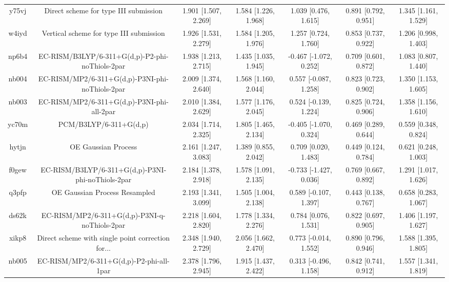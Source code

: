 \documentclass{article}
\begin{document}
\begin{center}
\begin{longtable}{|ccccccc|}
 y75vj &              Direct scheme for type III submission &  1.901 [1.507, 2.269] &  1.584 [1.226, 1.968] &     1.039 [0.476, 1.615] &  0.891 [0.792, 0.951] &   1.345 [1.161, 1.529] \\
 w4iyd &            Vertical scheme for type III submission &  1.926 [1.531, 2.279] &  1.584 [1.205, 1.976] &     1.257 [0.724, 1.760] &  0.853 [0.737, 0.922] &   1.206 [0.998, 1.403] \\
 np6b4 &    EC-RISM/B3LYP/6-311+G(d,p)-P2-phi-noThiols-2par &  1.938 [1.213, 2.715] &  1.435 [1.035, 1.945] &   -0.467 [-1.072, 0.252] &  0.709 [0.601, 0.872] &   1.083 [0.807, 1.440] \\
 nb004 &    EC-RISM/MP2/6-311+G(d,p)-P3NI-phi-noThiols-2par &  2.009 [1.374, 2.640] &  1.568 [1.160, 2.044] &    0.557 [-0.087, 1.258] &  0.823 [0.723, 0.902] &   1.350 [1.153, 1.605] \\
 nb003 &         EC-RISM/MP2/6-311+G(d,p)-P3NI-phi-all-2par &  2.010 [1.384, 2.629] &  1.577 [1.176, 2.045] &    0.524 [-0.139, 1.224] &  0.825 [0.724, 0.906] &   1.358 [1.156, 1.610] \\
 yc70m &                             PCM/B3LYP/6-311+G(d,p) &  2.034 [1.714, 2.325] &  1.805 [1.465, 2.134] &   -0.405 [-1.070, 0.324] &  0.469 [0.289, 0.644] &   0.559 [0.348, 0.824] \\
 hytjn &                                OE Gaussian Process &  2.161 [1.247, 3.083] &  1.389 [0.855, 2.042] &     0.709 [0.020, 1.483] &  0.449 [0.124, 0.784] &   0.621 [0.248, 1.003] \\
 f0gew &  EC-RISM/B3LYP/6-311+G(d,p)-P3NI-phi-noThiols-2par &  2.184 [1.378, 2.918] &  1.578 [1.091, 2.135] &   -0.733 [-1.427, 0.036] &  0.769 [0.667, 0.892] &   1.291 [1.017, 1.626] \\
 q3pfp &                      OE Gaussian Process Resampled &  2.193 [1.341, 3.099] &  1.505 [1.004, 2.138] &    0.589 [-0.107, 1.397] &  0.443 [0.138, 0.767] &   0.658 [0.283, 1.067] \\
 ds62k &      EC-RISM/MP2/6-311+G(d,p)-P3NI-q-noThiols-2par &  2.218 [1.604, 2.820] &  1.778 [1.334, 2.276] &     0.784 [0.076, 1.531] &  0.822 [0.697, 0.905] &   1.406 [1.197, 1.627] \\
 xikp8 &  Direct scheme with single point correction for... &  2.348 [1.940, 2.729] &  2.056 [1.662, 2.470] &    0.773 [-0.014, 1.552] &  0.890 [0.796, 0.946] &   1.588 [1.395, 1.805] \\
 nb005 &           EC-RISM/MP2/6-311+G(d,p)-P2-phi-all-1par &  2.378 [1.796, 2.945] &  1.915 [1.437, 2.422] &    0.313 [-0.496, 1.158] &  0.842 [0.741, 0.912] &   1.557 [1.341, 1.819] \\

\end{longtable}
\end{center}
\end{document}
